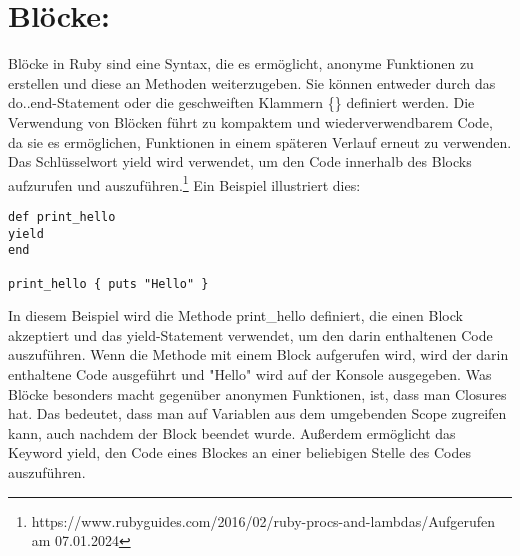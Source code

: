 \documentclass{article}
\begin{document}
\section*{ Blöcke:}
Blöcke in Ruby sind eine Syntax, die es ermöglicht, anonyme Funktionen zu erstellen und diese an Methoden weiterzugeben. Sie können entweder durch das do..end-Statement oder die geschweiften Klammern \{\} definiert werden. Die Verwendung von Blöcken führt zu kompaktem und wiederverwendbarem Code, da sie es ermöglichen, Funktionen in einem späteren Verlauf erneut zu verwenden. Das Schlüsselwort yield wird verwendet, um den Code innerhalb des Blocks aufzurufen und auszuführen.\footnote{https://www.rubyguides.com/2016/02/ruby-procs-and-lambdas/Aufgerufen am 07.01.2024}
Ein Beispiel illustriert dies:
\begin{lstlisting}
def print_hello 
yield
end

print_hello { puts "Hello" }
\end{lstlisting}
In diesem Beispiel wird die Methode print\_hello definiert, die einen Block akzeptiert und das yield-Statement verwendet, um den darin enthaltenen Code auszuführen. Wenn die Methode mit einem Block aufgerufen wird, wird der darin enthaltene Code ausgeführt und "Hello" wird auf der Konsole ausgegeben.
Was Blöcke besonders macht gegenüber anonymen Funktionen, ist, dass man Closures hat. Das bedeutet, dass man auf Variablen aus dem umgebenden Scope zugreifen kann, auch nachdem der Block beendet wurde.
Außerdem ermöglicht das Keyword yield, den Code eines Blockes an einer beliebigen Stelle des Codes auszuführen.
\end{document}
